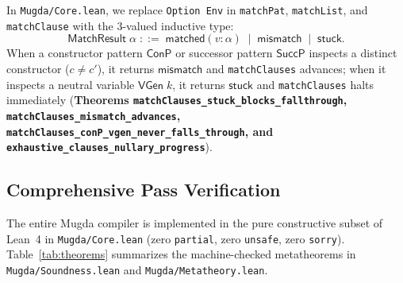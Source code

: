 \documentclass[11pt,a4paper]{article}
\begin{document}
In \texttt{Mugda/Core.lean}, we replace \texttt{Option Env} in \texttt{matchPat}, \texttt{matchList}, and \texttt{matchClause} with the 3-valued inductive type:
\[
  \mathsf{MatchResult}\;\alpha \;::=\; \mathsf{matched}(v : \alpha) \;\mid\; \mathsf{mismatch} \;\mid\; \mathsf{stuck}.
\]
When a constructor pattern $\mathsf{ConP}$ or successor pattern $\mathsf{SuccP}$ inspects a distinct constructor ($c \neq c'$), it returns $\mathsf{mismatch}$ and \texttt{matchClauses} advances; when it inspects a neutral variable $\mathsf{VGen}\;k$, it returns $\mathsf{stuck}$ and \texttt{matchClauses} halts immediately (\textbf{Theorems \texttt{matchClauses\_stuck\_blocks\_fallthrough}, \texttt{matchClauses\_mismatch\_advances}, \texttt{matchClauses\_conP\_vgen\_never\_falls\_through}, and \texttt{exhaustive\_clauses\_nullary\_progress}}).

\subsection{Comprehensive Pass Verification}

The entire Mugda compiler is implemented in the pure constructive subset of Lean~4 in \texttt{Mugda/Core.lean} (zero \texttt{partial}, zero \texttt{unsafe}, zero \texttt{sorry}).
Table~\ref{tab:theorems} summarizes the machine-checked metatheorems in \texttt{Mugda/Soundness.lean} and \texttt{Mugda/Metatheory.lean}.
\end{document}
